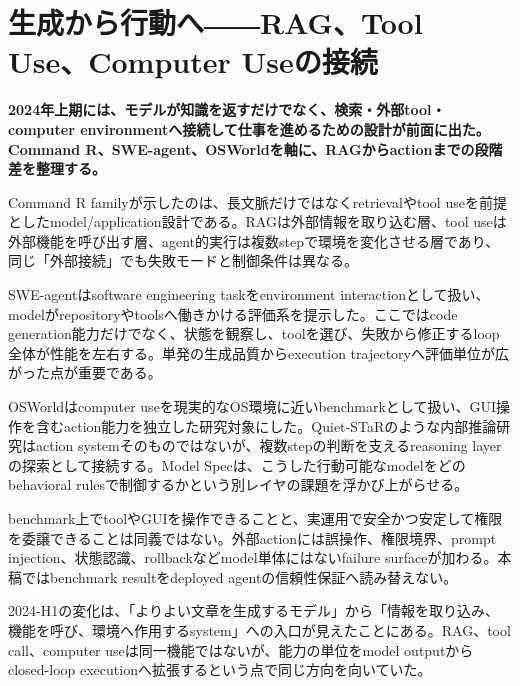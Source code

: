 \section{生成から行動へ――RAG、Tool Use、Computer Useの接続}
\noindent\textbf{2024年上期には、モデルが知識を返すだけでなく、検索・外部tool・computer environmentへ接続して仕事を進めるための設計が前面に出た。Command R、SWE-agent、OSWorldを軸に、RAGからactionまでの段階差を整理する。}\autocite{src-1c9f1d22c176,src-70b5d4b3bedd,src-77e35e5f22be}

Command R familyが示したのは、長文脈だけではなくretrievalやtool useを前提としたmodel/application設計である。RAGは外部情報を取り込む層、tool useは外部機能を呼び出す層、agent的実行は複数stepで環境を変化させる層であり、同じ「外部接続」でも失敗モードと制御条件は異なる。\autocite{src-77e35e5f22be}


SWE-agentはsoftware engineering taskをenvironment interactionとして扱い、modelがrepositoryやtoolsへ働きかける評価系を提示した。ここではcode generation能力だけでなく、状態を観察し、toolを選び、失敗から修正するloop全体が性能を左右する。単発の生成品質からexecution trajectoryへ評価単位が広がった点が重要である。\autocite{src-1c9f1d22c176}


OSWorldはcomputer useを現実的なOS環境に近いbenchmarkとして扱い、GUI操作を含むaction能力を独立した研究対象にした。Quiet-STaRのような内部推論研究はaction systemそのものではないが、複数stepの判断を支えるreasoning layerの探索として接続する。Model Specは、こうした行動可能なmodelをどのbehavioral rulesで制御するかという別レイヤの課題を浮かび上がらせる。\autocite{src-12fa04e64d24,src-70b5d4b3bedd,src-d1406200c99e}


\begin{claimboundary}
benchmark上でtoolやGUIを操作できることと、実運用で安全かつ安定して権限を委譲できることは同義ではない。外部actionには誤操作、権限境界、prompt injection、状態認識、rollbackなどmodel単体にはないfailure surfaceが加わる。本稿ではbenchmark resultをdeployed agentの信頼性保証へ読み替えない。\autocite{src-1c9f1d22c176,src-2f7e28810d05,src-70b5d4b3bedd,src-77e35e5f22be,src-edd253654067}
\end{claimboundary}

2024-H1の変化は、「よりよい文章を生成するモデル」から「情報を取り込み、機能を呼び、環境へ作用するsystem」への入口が見えたことにある。RAG、tool call、computer useは同一機能ではないが、能力の単位をmodel outputからclosed-loop executionへ拡張するという点で同じ方向を向いていた。\autocite{src-1c9f1d22c176,src-70b5d4b3bedd,src-77e35e5f22be,src-d1406200c99e}
